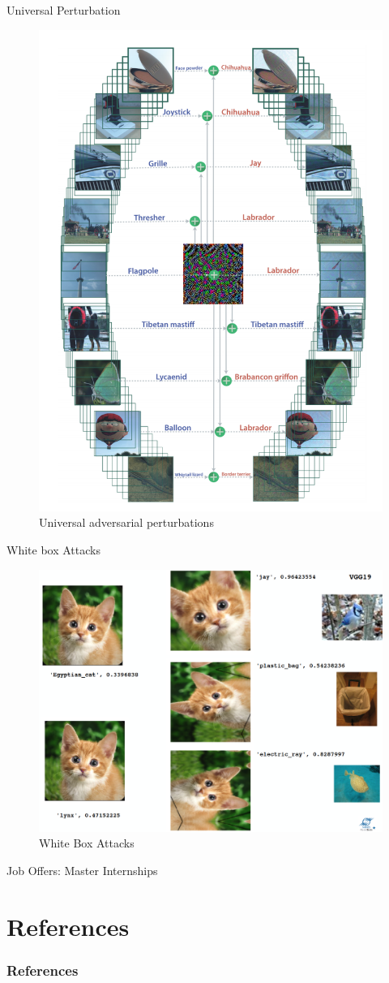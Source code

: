 \documentclass[xcolor=pdftex,dvipsnames,table,mathserif]{beamer}
\begin{document}
\begin{frame}{Universal Perturbation}
\begin{figure}
\includegraphics[width=.45\columnwidth]{../graphics/UniversalPerturbation}
\caption{Universal adversarial perturbations \cite{moosavi2017universal}}
\end{figure}
\end{frame}

\begin{frame}{White box Attacks}
\begin{figure}
\includegraphics[width=.95\columnwidth]{../graphics/WhiteBoxAttack}
\caption{White Box Attacks \cite{akhtar2018threat}}
\end{figure}
\end{frame}


\begin{frame}{Job Offers: Master Internships}
\end{frame}



\section{References}
\begin{frame}[allowframebreaks]
	\frametitle{References}
	
\end{frame}
\end{document}
